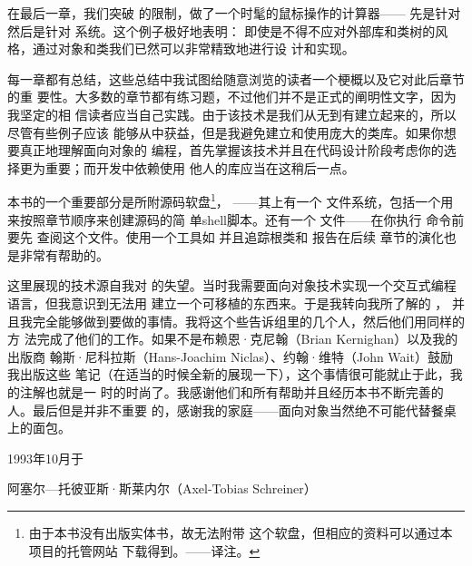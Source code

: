 在最后一章，我们突破 的限制，做了一个时髦的鼠标操作的计算器——
先是针对 然后是针对 系统。这个例子极好地表明：
即使是不得不应对外部库和类树的风格，通过对象和类我们已然可以非常精致地进行设
计和实现。

每一章都有总结，这些总结中我试图给随意浏览的读者一个梗概以及它对此后章节的重
要性。大多数的章节都有练习题，不过他们并不是正式的阐明性文字，因为我坚定的相
信读者应当自己实践。由于该技术是我们从无到有建立起来的，所以尽管有些例子应该
能够从中获益，但是我避免建立和使用庞大的类库。如果你想要真正地理解面向对象的
编程，首先掌握该技术并且在代码设计阶段考虑你的选择更为重要；而开发中依赖使用
他人的库应当在这稍后一点。

本书的一个重要部分是所附源码软盘\footnote{由于本书没有出版实体书，故无法附带
这个软盘，但相应的资料可以通过本项目的托管网站
下载得到。\hfill ——译注。}，
——其上有一个 文件系统，包括一个用来按照章节顺序来创建源码的简
单shell脚本。还有一个 文件——在你执行 命令前要先
查阅这个文件。使用一个工具如 并且追踪根类和 报告在后续
章节的演化也是非常有帮助的。

这里展现的技术源自我对 \cpp 的失望。当时我需要面向对象技术实现一个交互式编程
语言，但我意识到无法用 \cpp 建立一个可移植的东西来。于是我转向我所了解的
，
并且我完全能够做到要做的事情。我将这个些告诉组里的几个人，然后他们用同样的方
法完成了他们的工作。如果不是布赖恩·克尼翰（Brian Kernighan）以及我的出版商
翰斯·尼科拉斯（Hans-Joachim Niclas）、约翰·维特（John Wait）鼓励我出版这些
笔记（在适当的时候全新的展现一下），这个事情很可能就止于此，我的注解也就是一
时的时尚了。我感谢他们和所有帮助并且经历本书不断完善的人。最后但是并非不重要
的，感谢我的家庭——面向对象当然绝不可能代替餐桌上的面包。

\bigskip
\bigskip

\begin{flushright}
    1993年10月于

    阿塞尔—托彼亚斯·斯莱内尔（Axel-Tobias Schreiner）
\end{flushright}


